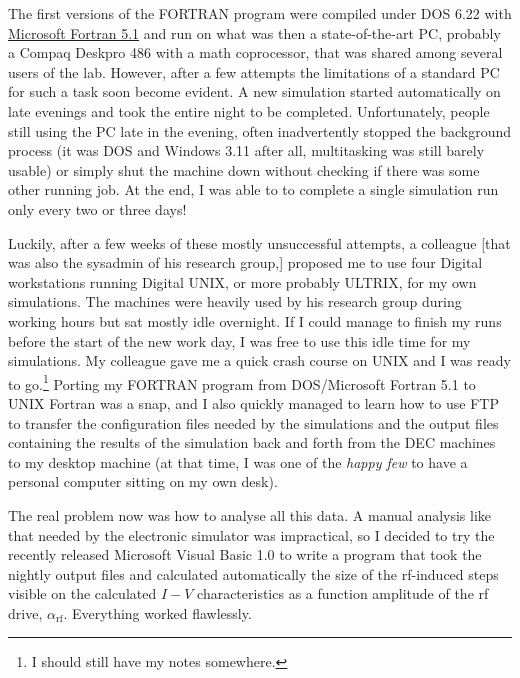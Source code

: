 The first versions of the FORTRAN program were compiled under DOS 6.22 with \href{https://winworldpc.com/product/microsoft-fortran/5x}{Microsoft Fortran 5.1} and run on what was then a state-of-the-art PC, probably a Compaq Deskpro 486 with a math coprocessor, that was shared among several users of the lab. 
However, after a few attempts the limitations of a standard PC for such a task soon become evident. A new simulation started automatically on late evenings and took the entire night to be completed. Unfortunately, people still using the PC late in the evening, often inadvertently stopped the background process (it was DOS and Windows 3.11 after all, multitasking was still barely usable) or simply shut the machine down without checking if there was some other running job. At the end, I was able to to complete a single simulation run only every two or three days! 

Luckily, after a few weeks of these mostly unsuccessful attempts, a colleague [that was also the sysadmin of his research group,] proposed me to use four Digital workstations running Digital UNIX, or more probably ULTRIX, for my own simulations. The machines were heavily used by his research group during working hours but sat mostly idle overnight. If I could manage to finish my runs before the start of the new work day, I was free to use this idle time for my simulations. My colleague gave me a quick crash course on UNIX and I was ready to go.\footnote{I should still have my notes somewhere.} Porting my FORTRAN program from DOS/Microsoft Fortran 5.1 to UNIX Fortran was a snap, and I also quickly managed to learn how to use FTP to transfer the configuration files needed by the simulations and the output files containing the results of the simulation back and forth from the DEC machines to my desktop machine (at that time, I was one of the \emph{happy few} to have a personal computer sitting on my own desk).

The real problem now was how to analyse all this data. A manual analysis like that needed by the electronic simulator was impractical, so I decided to try the recently released Microsoft Visual Basic 1.0 to write a program that took the nightly output files and calculated automatically the size of the rf-induced steps visible on the calculated $I-V$ characteristics as a function amplitude of the rf drive, $\alpha_\mathrm{rf}$.
Everything worked flawlessly.

